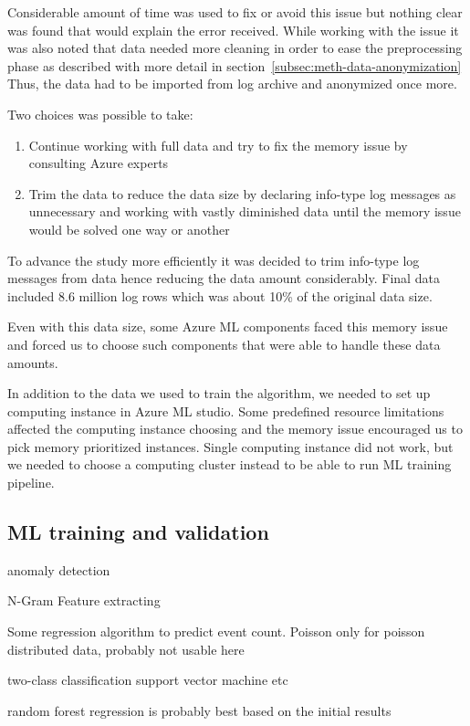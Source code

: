 Considerable amount of time was used
to fix or avoid this issue
but nothing clear was found
that would explain the error received.
While working with the issue
it was also noted
that data needed more cleaning
in order to ease the preprocessing phase
as described with more detail in section~\ref{subsec:meth-data-anonymization}
Thus,
the data had to be imported from log archive
and anonymized once more.

Two choices was possible to take:
\begin{enumerate}
    \item Continue working with full data
    and try to fix the memory issue
    by consulting Azure experts
    \item  Trim the data to reduce the data size
    by declaring info-type log messages
    as unnecessary
    and working with vastly diminished data
    until the memory issue would be solved
    one way or another
\end{enumerate}

To advance the study more efficiently
it was decided to trim info-type log messages from data
hence reducing the data amount considerably.
Final data included 8.6 million log rows
which was about 10\% of the original data size.

Even with this data size,
some Azure ML components faced this memory issue
and forced us to choose such components
that were able to handle these data amounts.


In addition to the data we used to train the algorithm,
we needed to set up computing instance
in Azure ML studio.
Some predefined resource limitations
affected the computing instance choosing
and the memory issue encouraged us
to pick memory prioritized instances.
Single computing instance did not work,
but we needed to choose a computing cluster instead
to be able to run ML training pipeline.



\subsection{ML training and validation}\label{subsec:ml-training-and-validation}

\begin{itcomment}
    anomaly detection

    N-Gram Feature extracting

    Some regression algorithm to predict event count.
    Poisson only for poisson distributed data, probably not usable here

    two-class classification
    support vector machine etc

    random forest regression is probably best based on the initial results
\end{itcomment}

